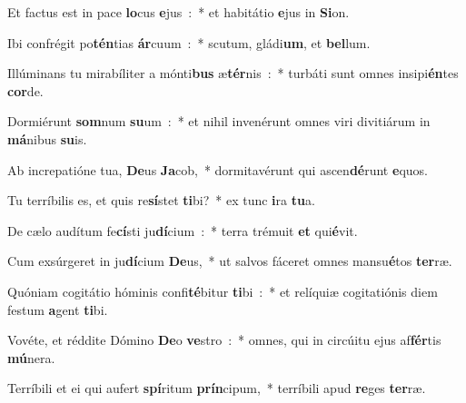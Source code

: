 ﻿\item Et factus est in pace \textbf{lo}cus \textbf{e}jus~:~* et habitátio \textbf{e}jus in \textbf{Si}on.
\item Ibi confrégit po\textbf{tén}tias \textbf{ár}cuum~:~* scutum, gládi\textbf{um}, et \textbf{bel}lum.\ifx\lalinebreakafterthree\undefined\else\\\fi
\item Illúminans tu mirabíliter a mónti\textbf{bus} æ\textbf{tér}nis~:~* turbáti sunt omnes insipi\textbf{én}tes \textbf{cor}de.
\item Dormiérunt \textbf{som}num \textbf{su}um~:~* et nihil invenérunt omnes viri divitiárum in \textbf{má}nibus \textbf{su}is.
\item Ab increpatióne tua, \textbf{De}us \textbf{Ja}cob,~* dormitavérunt qui ascen\textbf{dé}runt \textbf{e}quos.
\item Tu terríbilis es, et quis re\textbf{sí}stet \textbf{ti}bi?~* ex tunc \textbf{i}ra \textbf{tu}a.
\item De cælo audítum fe\textbf{cí}sti ju\textbf{dí}cium~:~* terra trémuit \textbf{et} qui\textbf{é}vit.
\item Cum exsúrgeret in ju\textbf{dí}cium \textbf{De}us,~* ut salvos fáceret omnes mansu\textbf{é}tos \textbf{ter}ræ.
\item Quóniam cogitátio hóminis confi\textbf{té}bitur \textbf{ti}bi~:~* et relíquiæ cogitatiónis diem festum \textbf{a}gent \textbf{ti}bi.
\item Vovéte, et réddite Dómino \textbf{De}o \textbf{ve}stro~:~* omnes, qui in circúitu ejus af\textbf{fér}tis \textbf{mú}nera.
\item Terríbili et ei qui aufert \textbf{spí}ritum \textbf{prín}cipum,~* terríbili apud \textbf{re}ges \textbf{ter}ræ.